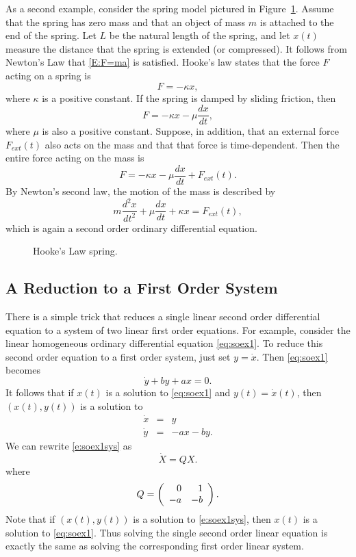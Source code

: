 \documentclass{ximera}
\begin{document}
As a second example, consider the spring model pictured in
Figure~\ref{F:spring2}.  Assume that the spring has zero mass and that
an object of mass $m$ is attached to the end of the spring.  Let $L$ be
the natural length of the spring, and let $x(t)$ measure the distance
that the spring is extended (or compressed).  It follows from Newton's
Law that \eqref{E:F=ma} is satisfied.  Hooke's law 
states that the force $F$ acting on a spring is
\[
 F = -\kappa x,
\]
where $\kappa$ is a positive constant.  If the spring is damped by
sliding friction, then
\[
F=-\kappa x - \mu \frac{dx}{dt},
\]
where $\mu$ is also a positive constant.  Suppose, in addition, that
an external force $F_{ext}(t)$ also acts on the
mass and that that
force is time-dependent.  Then the entire force acting on the mass is
\[
F=-\kappa x - \mu \frac{dx}{dt}+F_{ext}(t).
\]
By Newton's second law, the motion of the mass is described by
\begin{equation}  \label{e:springeq}
m\frac{d^2x}{dt^2} + \mu\frac{dx}{dt} + \kappa x = F_{ext}(t),
\end{equation}
which is again a second order ordinary differential equation.
\begin{figure}[thb]
      \centerline{%
      }
      \caption{Hooke's Law spring.}
      \label{F:spring2}
\end{figure}


\subsection*{A Reduction to a First Order System}

There is a simple trick that reduces a single linear second order
differential equation to a system of two linear first order equations.
For example, consider the linear homogeneous ordinary differential
equation \eqref{eq:soex1}.  To reduce this second order equation to a first order
system, just set $y=\dot{x}$.  Then \eqref{eq:soex1} becomes
\[
\dot{y} + by + ax = 0.
\]
It follows that if $x(t)$ is a solution to \eqref{eq:soex1} and
$y(t)=\dot{x}(t)$, then $(x(t),y(t))$ is a solution to
\begin{equation}  \label{e:soex1sys}
\begin{array}{rcl}
\dot{x} & = & y \\
\dot{y} & = & -ax - by.
\end{array}
\end{equation}
We can rewrite \eqref{e:soex1sys} as
\[
\dot{X} = Q X.
\]
where
\begin{equation}  \label{e:coeffmatQ}
Q =  \left(\begin{array}{rr} 0 & 1\\ -a &-b\end{array}\right).
\end{equation}
Note that if $(x(t),y(t))$ is a solution to \eqref{e:soex1sys}, then
$x(t)$ is a solution to \eqref{eq:soex1}.  Thus solving the single
second order linear equation is exactly the same as solving the
corresponding first order linear system.
\end{document}
